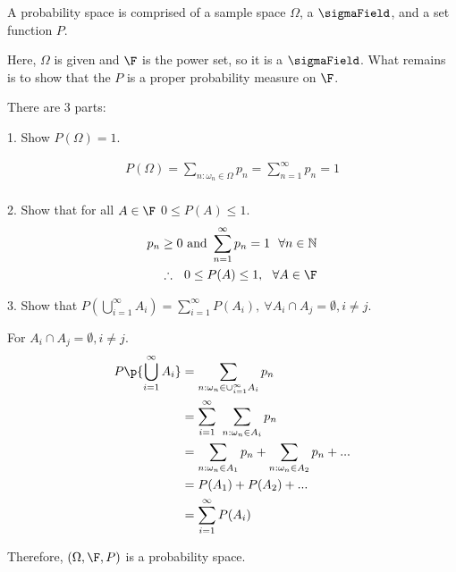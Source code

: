 A probability space is comprised of a sample space $\Omega$, a $\sigmaField$, and a
set function $P$.

Here, $\Omega$ is given and $\F$ is the power set, so it is a $\sigmaField$. What
remains is to show that the $P$  is a proper probability measure on $\F$.

There are 3 parts:

1. Show $P(\Omega) = 1$.

\begin{align*}
  P(\Omega) = \sum_{n:\omega_n \in \Omega} p_n = \sum_{n=1}^\infty p_n = 1\\
\end{align*}

2. Show that for all $A\in \F$ $0\le P(A)\le1$.
\begin{align*}
  p_n \ge 0 \text{ and } \sum_{n=1}^\infty p_n = 1 ~~\forall n \in \mathbb{N} \\
  \therefore ~~ 0 \le P(A) \le 1, ~~\forall A \in \F\\
\end{align*}

3. Show that $P(\bigcup_{i=1}^\infty A_i) = \sum_{i=1}^\infty P(A_i), ~\forall A_i \cap A_j = \emptyset, i\ne j$.

For $A_i \cap A_j = \emptyset, i\ne j$.
\begin{align*}
  P\p{\bigcup_{i=1}^\infty A_i}&= \sum_{n:\omega_n \in \cup_{i=1}^\infty A_i} p_n \\
                               &= \sum_{i=1}^\infty~\sum_{n: \omega_n\in A_i} p_n \\
                               &= \sum_{n: \omega_n\in A_1} p_n + \sum_{n: \omega_n\in A_2} p_n + ...\\
                               &= P(A_1) + P(A_2) + ... \\
                               &= \sum_{i=1}^\infty P(A_i) \\
\end{align*}

Therefore, $(\Omega, \F, P)$ is a probability space.
